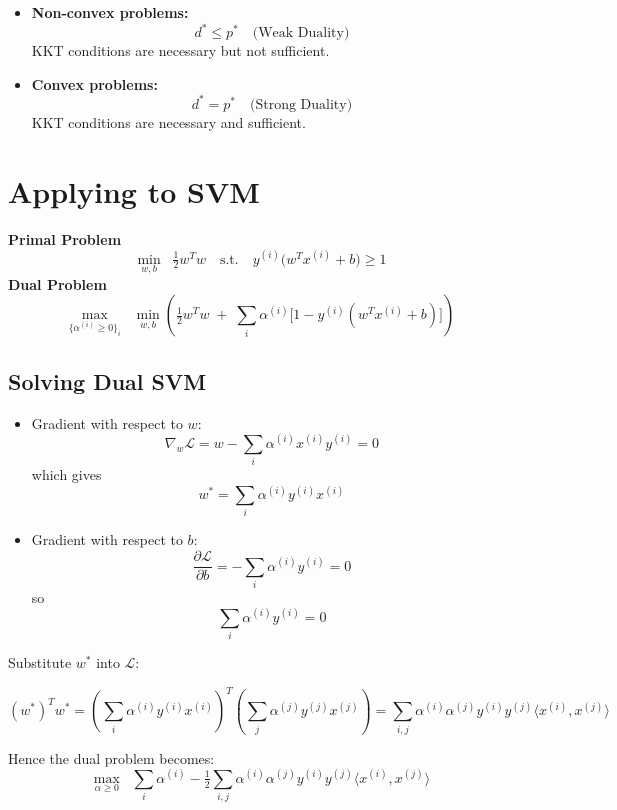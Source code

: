 \documentclass[11pt]{article}
\begin{document}
\begin{itemize}
    \item \textbf{Non-convex problems:}
    \[
    d^* \leq p^* \quad \text{(Weak Duality)}
    \]
    KKT conditions are necessary but not sufficient.

    \item \textbf{Convex problems:}
    \[
    d^* = p^* \quad \text{(Strong Duality)}
    \]
    KKT conditions are necessary and sufficient.
\end{itemize}

\section*{Applying to SVM}

\textbf{Primal Problem}
\[
\min_{w,b} \;\; \tfrac{1}{2} w^T w 
\quad \text{s.t.} \quad 
y^{(i)} \big(w^T x^{(i)} + b \big) \geq 1
\]
\textbf{Dual Problem}
\[
\max_{\{\alpha^{(i)} \geq 0\}_i} 
\;\; \min_{w,b} \left( 
\tfrac{1}{2} w^T w \;+\; 
\sum_i \alpha^{(i)} \Big[1 - y^{(i)} (w^T x^{(i)} + b) \Big] 
\right)
\]

\subsection*{Solving Dual SVM}

\begin{itemize}
    \item Gradient with respect to $w$:
    \[
    \nabla_w \mathcal{L} = w - \sum_i \alpha^{(i)} x^{(i)} y^{(i)} = 0
    \]
    which gives
    \[
    w^* = \sum_i \alpha^{(i)} y^{(i)} x^{(i)}
    \]

    \item Gradient with respect to $b$:
    \[
    \frac{\partial \mathcal{L}}{\partial b} 
    = - \sum_i \alpha^{(i)} y^{(i)} = 0
    \]
    so
    \[
    \sum_i \alpha^{(i)} y^{(i)} = 0
    \]
\end{itemize}

Substitute $w^*$ into $\mathcal{L}$:

\[
(w^*)^T w^* = 
\left( \sum_i \alpha^{(i)} y^{(i)} x^{(i)} \right)^T
\left( \sum_j \alpha^{(j)} y^{(j)} x^{(j)} \right)
= \sum_{i,j} \alpha^{(i)} \alpha^{(j)} y^{(i)} y^{(j)} \langle x^{(i)}, x^{(j)} \rangle
\]

Hence the dual problem becomes:
\[
\max_{\alpha \geq 0} 
\;\; \sum_i \alpha^{(i)} 
- \tfrac{1}{2} \sum_{i,j} \alpha^{(i)} \alpha^{(j)} y^{(i)} y^{(j)} \langle x^{(i)}, x^{(j)} \rangle
\]
\end{document}
